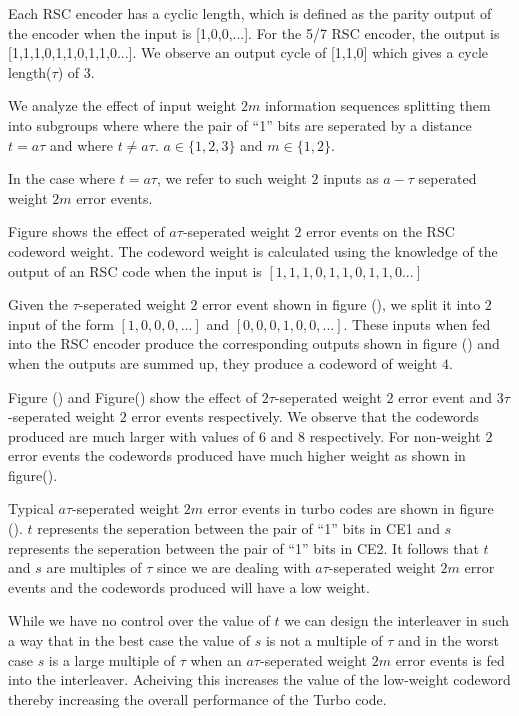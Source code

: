 \documentclass[20 pts]{article}
\begin{document}
Each RSC encoder has a cyclic length, which is defined as the parity output of the
 encoder when the input is [1,0,0,...]. For the 5/7 RSC encoder, the output is
 [1,1,1,0,1,1,0,1,1,0...]. We observe an output cycle of [1,1,0] which gives a cycle 
 length($\tau$) of 3. 
 
 We analyze the effect of input weight $2m$ information sequences splitting them into
 subgroups where
 where the pair 
 of ``1'' bits are seperated by a distance $t=a\tau$ and where $t \neq a\tau$.
 $a\in\{1,2,3\}$ and $m \in \{1,2\}$. 
 
 In the case where $t=a\tau$, we refer to such weight $2$ inputs as
   $a-\tau$ seperated weight $2m$ error events.
 
 
 Figure shows the effect of $a\tau$-seperated weight $2$ error events on the RSC 
 codeword  weight. The codeword weight is calculated using the knowledge of the
 output of an RSC code when the input is $[1,1,1,0,1,1,0,1,1,0...]$
 
 Given the $\tau$-seperated weight $2$ error event shown in figure (), we split it
 into $2$ input of the form $[1,0,0,0,...]$ and $[0,0,0,1,0,0,...]$. These inputs when 
 fed into the RSC encoder produce the corresponding outputs shown in figure () and 
 when the outputs are summed up, they produce a codeword of weight $4$. 
 
 Figure () and Figure() show the effect of $2\tau$-seperated weight $2$ error event
 and $3\tau$-seperated weight $2$ error events respectively. We observe that the
 codewords produced are much larger with values of $6$ and $8$ respectively.
 For non-weight $2$ error events the codewords produced have much higher weight
 as shown in figure().
 
 
  Typical $a\tau$-seperated weight $2m$ error events in turbo codes are shown in 
  figure (). 
  $t$ represents the seperation between the pair of ``1'' bits in CE1 and 
  $s$ represents the seperation between the pair of ``1'' bits in CE2. It follows that
  $t$ and $s$ are multiples of $\tau$ since we are dealing with $a\tau$-seperated 
  weight $2m$ error events and the codewords produced will have a low weight.
  
  While we have no control over the value of $t$ we can design the interleaver in such
  a way that in the best case the value of $s$ is not a multiple of $\tau$ and in the 
  worst case $s$ is a large multiple of $\tau$ when an $a\tau$-seperated weight $2m$ 
  error events is fed into the interleaver. Acheiving this increases the value of the 
  low-weight codeword thereby increasing the overall performance of the Turbo code.
  
\end{document}
